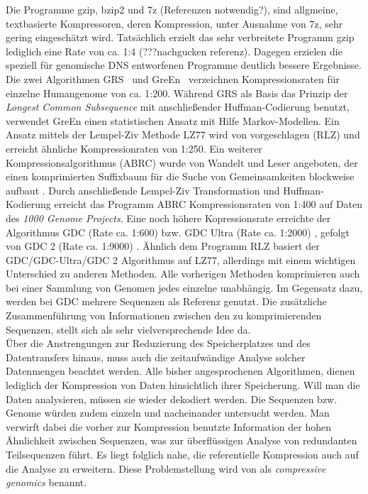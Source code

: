 \documentclass[12pt]{article}
\begin{document}
Die Programme gzip, bzip2 und 7z (Referenzen notwendig?), sind allgmeine, textbasierte Kompressoren, deren Kompression, unter Ausnahme von 7z, sehr gering eingeschätzt wird. Tatsächlich erzielt das sehr verbreitete Programm gzip lediglich eine Rate von ca. 1:4 (???nachgucken referenz).
Dagegen erzielen die speziell für genomische DNS entworfenen Programme deutlich bessere Ergebnisse. Die zwei Algorithmen GRS~\cite{wang11GRS} und GreEn~\cite{pinho12Green} verzeichnen Kompressionsraten für einzelne Humangenome von ca. 1:200. Während GRS als Basis das Prinzip der \textit{Longest Common Subsequence} mit anschließender Huffman-Codierung benutzt, verwendet GreEn einen statistischen Ansatz mit Hilfe Markov-Modellen. Ein Ansatz mittels der Lempel-Ziv Methode LZ77 wird von \cite{Kuruppu:RLZ} vorgeschlagen (RLZ) und erreicht ähnliche Kompressionraten von 1:250. Ein weiterer Kompressionsalgorithmus (ABRC) wurde von Wandelt und Leser angeboten, der einen komprimierten Suffixbaum für die Suche von Gemeinsamkeiten blockweise aufbaut \cite{wandelt:ABRC}. Durch anschließende Lempel-Ziv Transformation und Huffman-Kodierung erreicht das Programm ABRC Kompressionsraten von 1:400 auf Daten des \textit{1000 Genome Projects}. Eine noch höhere Kopressionsrate erreichte der Algorithmus GDC (Rate ca. 1:600) bzw. GDC Ultra (Rate ca. 1:2000) \cite{deoriwicz:GDC}, gefolgt von GDC 2 (Rate ca. 1:9000) \cite{deoriwicz:GDC2}. Ähnlich dem Programm RLZ basiert der GDC/GDC-Ultra/GDC 2 Algorithmus auf LZ77,  allerdings mit einem wichtigen Unterschied zu anderen Methoden. Alle vorherigen Methoden komprimieren auch bei einer Sammlung von Genomen jedes einzelne unabhängig. Im Gegensatz dazu, werden bei GDC mehrere Sequenzen als Referenz genutzt. Die zusätzliche Zusammenführung von Informationen zwischen den zu komprimierenden Sequenzen, stellt sich als sehr vielversprechende Idee da.\\

Über die Anstrengungen zur Reduzierung des Speicherplatzes und des Datentransfers hinaus, muss auch die zeitaufwändige Analyse solcher Datenmengen beachtet werden. Alle bisher angesprochenen Algorithmen, dienen lediglich der Kompression von Daten hinsichtlich ihrer Speicherung. Will man die Daten analysieren, müssen sie wieder dekodiert werden. Die Sequenzen bzw. Genome würden zudem einzeln und nacheinander untersucht werden. Man verwirft dabei die vorher zur Kompression benutzte Information der hohen Ähnlichkeit zwischen Sequenzen, was zur überflüssigen Analyse von redundanten Teilsequenzen führt. Es liegt folglich nahe, die referentielle Kompression auch auf die Analyse zu erweitern. Diese Problemstellung wird von \cite{loh12compressivegenomics} als \textit{compressive genomics} benannt. 
\end{document}
